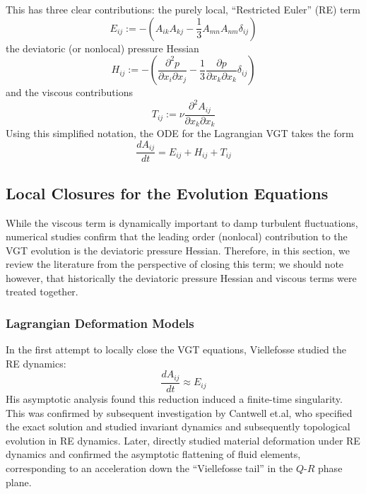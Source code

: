 This has three clear contributions:
%
the purely local, ``Restricted Euler'' (RE) term
\begin{equation}
    E_{ij} := - \left(A_{ik}A_{kj} - \frac{1}{3}A_{mn}A_{nm}\delta_{ij}\right)
\end{equation}
%
the deviatoric (or nonlocal) pressure Hessian
\begin{equation}
  H_{ij} := - \left( \frac{\partial^2 p}{\partial x_i \partial x_j} - \frac{1}{3}\frac{\partial p}{\partial x_k \partial x_k}\delta_{ij}  \right)
\end{equation}
%
and the viscous contributions
\begin{equation}
    T_{ij} := \nu \frac{\partial^2 A_{ij}}{\partial x_k \partial x_k}
\end{equation}
Using this simplified notation, the ODE for the Lagrangian VGT takes the form
\begin{equation}
    \frac{dA_{ij}}{dt} = E_{ij} + H_{ij} + T_{ij}
\end{equation}

\subsection{Local Closures for the Evolution Equations}
While the viscous term is dynamically important to damp turbulent fluctuations, numerical studies confirm that the leading order (nonlocal) contribution to the VGT evolution is the deviatoric pressure Hessian\cite{martin1998dynamics}\cite{tian2021}. Therefore, in this section, we review the literature from the perspective of closing this term; we should note however, that historically the deviatoric pressure Hessian and viscous terms were treated together.

\subsubsection{Lagrangian Deformation Models}
In the first attempt to locally close the VGT equations, Viellefosse \cite{vieillefosse1984} studied the RE dynamics:
\begin{equation}
    \frac{dA_{ij}}{dt} \approx E_{ij}
\end{equation}
His asymptotic analysis found this reduction induced a finite-time singularity. This was confirmed by subsequent investigation by Cantwell et.al\cite{cantwell1992}\cite{cantwell1993behavior}, who specified the exact solution and studied invariant dynamics and subsequently topological evolution in RE dynamics. Later, \cite{li2007material} directly studied material deformation under RE dynamics and confirmed the asymptotic flattening of fluid elements, corresponding to an acceleration down the ``Viellefosse tail'' in the $Q\text{-}R$ phase plane.

